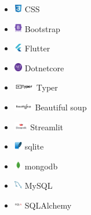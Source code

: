 \documentclass{article}
\begin{document}
\begin{multicols}{3}
\begin{itemize}
    \item \includegraphics[height=10pt]{images/icons/css3.png} CSS
    \item \includegraphics[height=10pt]{images/icons/bootstrap.png} Bootstrap
    \item \includegraphics[height=10pt]{images/icons/flutter-original.png} Flutter
    \item \includegraphics[height=10pt]{images/icons/dotnetcore.png} Dotnetcore
    \item \includegraphics[height=10pt]{images/icons/typer.png} Typer
    \item \includegraphics[height=10pt]{images/icons/bs.png} Beautiful soup
    \item \includegraphics[height=10pt]{images/icons/streamlit.png} Streamlit
    \item \includegraphics[height=10pt]{images/icons/sqlite-original.png} sqlite
    \item \includegraphics[height=10pt]{images/icons/mongodb-original.png} mongodb
    \item \includegraphics[height=10pt]{images/icons/mysql-original.png} MySQL
    \item \includegraphics[height=10pt]{images/icons/sqlalchemy-original.png} SQLAlchemy
\end{itemize}


\end{multicols}
\end{document}
